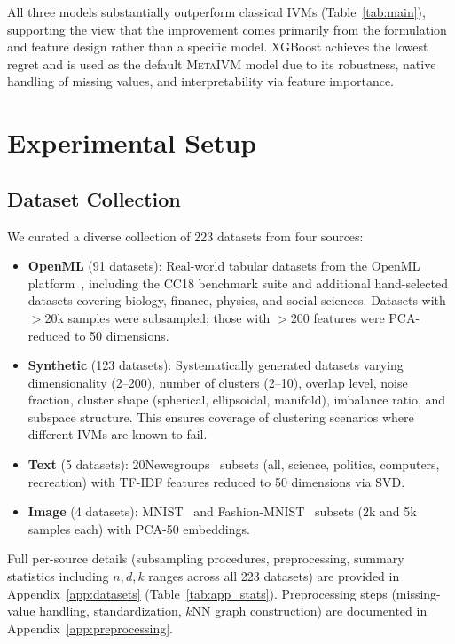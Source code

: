 \documentclass[10pt]{article} %
\newcommand{\ours}{\textsc{MetaIVM}}
\begin{document}
All three models substantially outperform classical IVMs (Table~\ref{tab:main}), supporting the view that the improvement comes primarily from the formulation and feature design rather than a specific model. XGBoost achieves the lowest regret and is used as the default \ours{} model due to its robustness, native handling of missing values, and interpretability via feature importance.


\section{Experimental Setup}
\label{sec:setup}

\subsection{Dataset Collection}

We curated a diverse collection of 223 datasets from four sources:

\begin{itemize}
    \item \textbf{OpenML} (91 datasets): Real-world tabular datasets from the OpenML platform~\citep{vanschoren2014openml}, including the CC18 benchmark suite and additional hand-selected datasets covering biology, finance, physics, and social sciences. Datasets with $>$20k samples were subsampled; those with $>$200 features were PCA-reduced to 50 dimensions.
    \item \textbf{Synthetic} (123 datasets): Systematically generated datasets varying dimensionality (2--200), number of clusters (2--10), overlap level, noise fraction, cluster shape (spherical, ellipsoidal, manifold), imbalance ratio, and subspace structure. This ensures coverage of clustering scenarios where different IVMs are known to fail.
    \item \textbf{Text} (5 datasets): 20Newsgroups~\citep{lang199520newsgroups} subsets (all, science, politics, computers, recreation) with TF-IDF features reduced to 50 dimensions via SVD.
    \item \textbf{Image} (4 datasets): MNIST~\citep{lecun1998mnist} and Fashion-MNIST~\citep{xiao2017fashionmnist} subsets (2k and 5k samples each) with PCA-50 embeddings.
\end{itemize}
Full per-source details (subsampling procedures, preprocessing, summary statistics including $n, d, k$ ranges across all 223 datasets) are provided in Appendix~\ref{app:datasets} (Table~\ref{tab:app_stats}). Preprocessing steps (missing-value handling, standardization, $k$NN graph construction) are documented in Appendix~\ref{app:preprocessing}.
\end{document}
